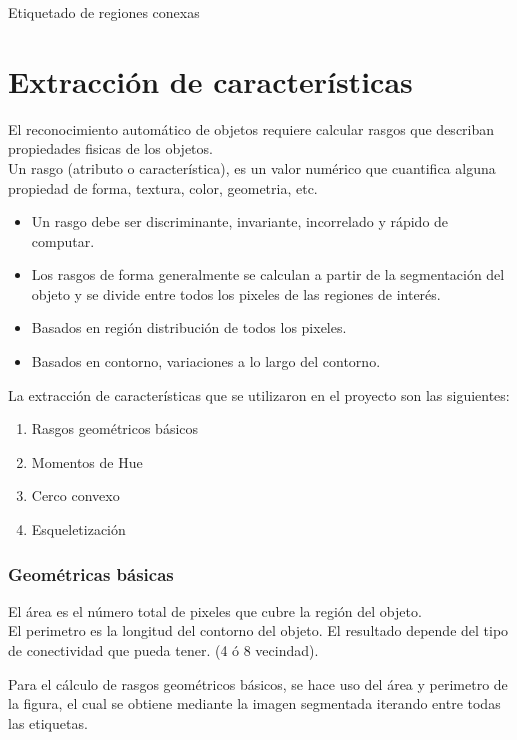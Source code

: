 \documentclass[a4paper, 11pt]{article}
\begin{document}
Etiquetado de regiones conexas\\


\pagebreak
\section{Extracción de características}

El reconocimiento automático de objetos requiere calcular rasgos que describan propiedades fisicas de los objetos.\\

Un rasgo (atributo o característica), es un valor numérico que cuantifica alguna propiedad de forma, textura, color, geometria, etc.

\begin{itemize}
\item Un rasgo debe ser discriminante, invariante, incorrelado y rápido de computar.
\item Los rasgos de forma generalmente se calculan a partir de la segmentación del objeto y se divide entre todos los pixeles de las regiones de interés.
\item Basados en región distribución de todos los pixeles.
\item Basados en contorno, variaciones a lo largo del contorno.
\end{itemize}

La extracción de características que se utilizaron en el proyecto son las siguientes:

\begin{enumerate}
\item Rasgos geométricos básicos
\item Momentos de Hue
\item Cerco convexo
\item Esqueletización
\end{enumerate}

\subsubsection{Geométricas básicas}

El área es el número total de pixeles que cubre la región del objeto.\\

El perimetro es la longitud del contorno del objeto. El resultado depende del tipo de conectividad que pueda tener. (4 ó 8 vecindad).

Para el cálculo de rasgos geométricos básicos, se hace uso del área y perimetro de la figura, el cual se obtiene mediante la imagen segmentada iterando entre todas las etiquetas.
\end{document}
